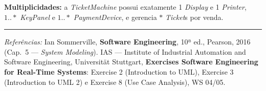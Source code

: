 \documentclass[11pt,a4paper]{article}
\begin{document}
\begin{resposta}
\begin{center}
{}
\end{center}
\textbf{Multiplicidades:} a \textit{TicketMachine} possui exatamente 1
\textit{Display} e 1 \textit{Printer}, $1..*$ \textit{KeyPanel} e $1..*$
\textit{PaymentDevice}, e gerencia $*$ \textit{Ticket}s por venda.
\end{resposta}

\vspace{8pt}\hrule\vspace{6pt}
\begin{center}
  {\small \textit{Referências:} Ian Sommerville, \textbf{Software Engineering},
  10ª ed., Pearson, 2016 (Cap.\ 5 — \textit{System Modeling}). \;
  IAS — Institute of Industrial Automation and Software Engineering,
  Universität Stuttgart, \textbf{Exercises Software Engineering for Real-Time
  Systems}: Exercise 2 (Introduction to UML), Exercise 3 (Introduction to
  UML 2) e Exercise 8 (Use Case Analysis), WS 04/05.}
\end{center}
\end{document}
